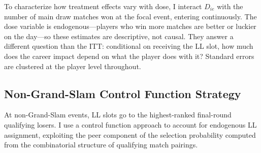 To characterize how treatment effects vary with dose, I interact $D_{ie}$ with the number of main draw matches won at the focal event, entering continuously. The dose variable is endogenous---players who win more matches are better or luckier on the day---so these estimates are descriptive, not causal. They answer a different question than the ITT: conditional on receiving the LL slot, how much does the career impact depend on what the player does with it? Standard errors are clustered at the player level throughout.

\subsection{Non-Grand-Slam Control Function Strategy}
\label{sec:strategy_iv}

At non-Grand-Slam events, LL slots go to the highest-ranked final-round qualifying losers. I use a control function approach to account for endogenous LL assignment, exploiting the peer component of the selection probability computed from the combinatorial structure of qualifying match pairings.

